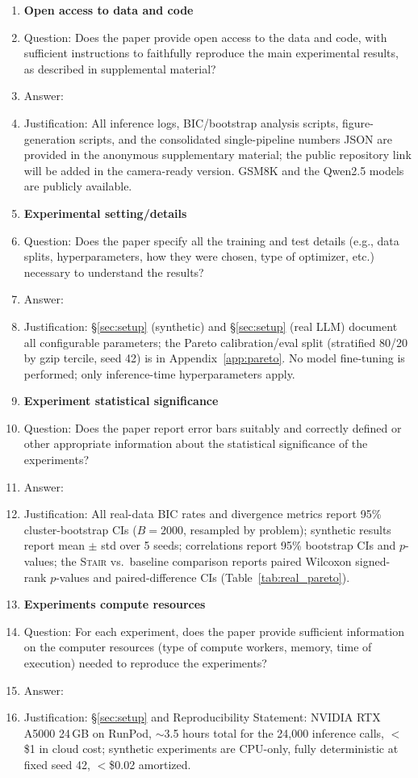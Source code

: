 \documentclass{article}
\newcommand{\method}{\textsc{Stair}}
\begin{document}
\begin{enumerate}
\item {\bf Open access to data and code}
    \item[] Question: Does the paper provide open access to the data and code, with sufficient instructions to faithfully reproduce the main experimental results, as described in supplemental material?
    \item[] Answer: \answerYes{}
    \item[] Justification: All inference logs, BIC/bootstrap analysis scripts, figure-generation scripts, and the consolidated single-pipeline numbers JSON are provided in the anonymous supplementary material; the public repository link will be added in the camera-ready version. GSM8K and the Qwen2.5 models are publicly available.

\item {\bf Experimental setting/details}
    \item[] Question: Does the paper specify all the training and test details (e.g., data splits, hyperparameters, how they were chosen, type of optimizer, etc.) necessary to understand the results?
    \item[] Answer: \answerYes{}
    \item[] Justification: \S\ref{sec:setup} (synthetic) and \S\ref{sec:setup} (real LLM) document all configurable parameters; the Pareto calibration/eval split (stratified 80/20 by gzip tercile, seed 42) is in Appendix~\ref{app:pareto}. No model fine-tuning is performed; only inference-time hyperparameters apply.

\item {\bf Experiment statistical significance}
    \item[] Question: Does the paper report error bars suitably and correctly defined or other appropriate information about the statistical significance of the experiments?
    \item[] Answer: \answerYes{}
    \item[] Justification: All real-data BIC rates and divergence metrics report 95\% cluster-bootstrap CIs ($B{=}2000$, resampled by problem); synthetic results report mean $\pm$ std over 5 seeds; correlations report 95\% bootstrap CIs and $p$-values; the \method{} vs.\ baseline comparison reports paired Wilcoxon signed-rank $p$-values and paired-difference CIs (Table~\ref{tab:real_pareto}).

\item {\bf Experiments compute resources}
    \item[] Question: For each experiment, does the paper provide sufficient information on the computer resources (type of compute workers, memory, time of execution) needed to reproduce the experiments?
    \item[] Answer: \answerYes{}
    \item[] Justification: \S\ref{sec:setup} and Reproducibility Statement: NVIDIA RTX A5000 24\,GB on RunPod, $\sim$3.5 hours total for the 24{,}000 inference calls, $<$\$1 in cloud cost; synthetic experiments are CPU-only, fully deterministic at fixed seed 42, $<$\$0.02 amortized.


\end{enumerate}
\end{document}
